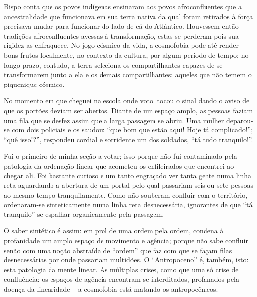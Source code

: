 Bispo conta que os povos indígenas ensinaram aos povos afroconfluentes que a ancestralidade que funcionava em sua terra nativa da qual foram retirados à força precisava mudar para funcionar do lado de cá do Atlântico. Houvessem então tradições afroconfluentes avessas à transformação, estas se perderam pois sua rigidez as enfraquece. No jogo cósmico da vida, a cosmofobia pode até render bons frutos localmente, no contexto da cultura, por algum período de tempo; no longo prazo, contudo, a terra seleciona os compartilhantes capazes de se transformarem junto a ela e os demais compartilhantes: aqueles que não temem o piquenique cósmico.


No momento em que cheguei na escola onde voto, tocou o sinal dando o aviso de que os portões deviam ser abertos. Diante de um espaço amplo, as pessoas faziam uma fila que se desfez assim que a larga passagem se abriu. Uma mulher deparou-se com dois policiais e os saudou: \enquote{que bom que estão aqui! Hoje tá complicado!}; \enquote{quê isso!?}, respondeu cordial e sorridente um dos soldados, \enquote{tá tudo tranquilo!}.

Fui o primeiro de minha seção a votar; isso porque não fui contaminado pela patologia da ordenação linear que acometeu os enfileirados que encontrei ao chegar ali. Foi bastante curioso e um tanto engraçado ver tanta gente numa linha reta aguardando a abertura de um portal pelo qual passariam seis ou sete pessoas ao mesmo tempo tranquilamente. Como não souberam confluir com o território, ordenaram-se sinteticamente numa linha reta desnecessária, ignorantes de que \enquote{tá tranquilo} se espalhar organicamente pela passagem.

O saber sintético é assim: em prol de uma ordem pela ordem, condena à profanidade um amplo espaço de movimento e agência; porque não sabe confluir senão com uma noção abstraída de \enquote{ordem} que faz com que se façam filas desnecessárias por onde passariam multidões. O \enquote{Antropoceno} é, também, isto: esta patologia da mente linear. As múltiplas crises, como que uma só crise de confluência: os espaços de agência encontram-se interditados, profanados pela doença da linearidade -- a cosmofobia está matando os antropocênicos.

